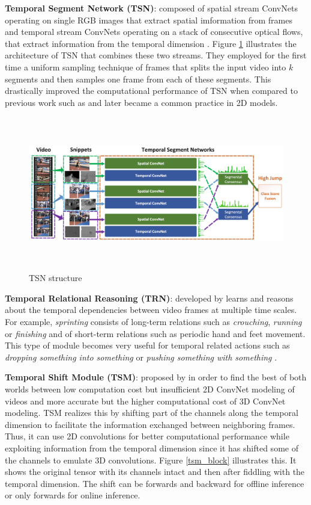 \documentclass[extern,palatino]{cgMA}
\begin{document}
\noindent\textbf{Temporal Segment Network (TSN)}: composed of spatial stream ConvNets operating on single RGB images that extract spatial imformation from frames and temporal stream ConvNets operating on a stack of consecutive optical flows, that extract information from the temporal dimension \cite{wang2016temporal}. Figure \ref{tsn_structure} illustrates the architecture of TSN that combines these two streams. They employed for the first time a uniform sampling technique of frames that splits the input video into $k$ segments and then samples one frame from each of these segments. This drastically improved the computational performance of TSN when compared to previous work such as \cite{tran2015learning} and later became a common practice in 2D models.

\begin{figure}[h]
\center
\includegraphics[height={190pt}, width={430pt}]{images/tsn_structure.png}
\caption{TSN structure \cite{wang2016temporal}}
\label{tsn_structure}
\end{figure}

\bigskip
\noindent\textbf{Temporal Relational Reasoning (TRN)}: developed by \cite{zhou2018temporal} learns and reasons about the temporal dependencies between video frames at multiple time scales. For example, \textit{sprinting} consists of long-term relations such as \textit{crouching}, \textit{running} or \textit{finishing} and of short-term relations such as periodic hand and feet movement. This type of module becomes very useful for temporal related actions such as \textit{dropping something into something} or \textit{pushing something with something} \cite{goyal2017something}.

\bigskip
\noindent\textbf{Temporal Shift Module (TSM)}: proposed by \cite{lin2019tsm} in order to find the best of both worlds between low computation cost but insufficient 2D ConvNet modeling of videos and more accurate but the higher computational cost of 3D ConvNet modeling. TSM realizes this by shifting part of the channels along the temporal dimension to facilitate the information exchanged between neighboring frames. Thus, it can use 2D convolutions for better computational performance while exploiting information from the temporal dimension since it has shifted some of the channels to emulate 3D convolutions. Figure \ref{tsm_block} illustrates this. It shows the original tensor with its channels intact and then after fiddling with the temporal dimension. The shift can be forwards and backward for offline inference or only forwards for online inference.
\end{document}
